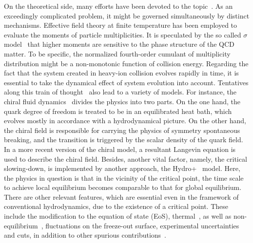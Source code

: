\documentclass[secnumarabic, graphics,floatfix, nofootinbib,tightenlines,nobibnotes, aps, prl, 12pt]{revtex4-1}
\begin{document}
On the theoretical side, many efforts have been devoted to the topic~\cite{qcd-phase-fluctuations-review-01,qcd-phase-fluctuations-review-02}.
As an exceedingly complicated problem, it might be governed simultaneously by distinct mechanisms.
Effective field theory at finite temperature has been employed to evaluate the moments of particle multiplicities.
It is speculated by the so called $\sigma$ model~\cite{qcd-phase-fluctuations-02,qcd-phase-fluctuations-03,qcd-phase-fluctuations-04} that higher moments are sensitive to the phase structure of the QCD matter.
To be specific, the normalized fourth-order cumulant of multiplicity distribution might be a non-monotonic function of collision energy. 
Regarding the fact that the system created in heavy-ion collision evolves rapidly in time, it is essential to take the dynamical effect of system evolution into account.
Tentatives along this train of thought~\cite{hydro-chiral-01} also lead to a variety of models.
For instance, the chiral fluid dynamics~\cite{hydro-chiral-04,hydro-chiral-07,hydro-chiral-08,hydro-chiral-09} divides the physics into two parts.
On the one hand, the quark degree of freedom is treated to be in an equilibrated heat bath, which evolves mostly in accordance with a hydrodynamical picture.
On the other hand, the chiral field is responsible for carrying the physics of symmetry spontaneous breaking, and the transition is triggered by the scalar density of the quark field. 
In a more recent version of the chiral model, a resultant Langevin equation is used to describe the chiral field.
Besides, another vital factor, namely, the critical slowing-down, is implemented by another approach, the Hydro+~\cite{hydro-chiral-sigma-01} model.
Here, the physics in question is that in the vicinity of the critical point, the time scale to achieve local equilibrium becomes comparable to that for global equilibrium.
There are other relevant features, which are essential even in the framework of conventional hydrodynamics, due to the existence of a critical point.
These include the modification to the equation of state (EoS), thermal~\cite{hydro-fluctuations-03}, as well as non-equilibrium~\cite{hydro-fluctuations-02}, fluctuations on the freeze-out surface, experimental uncertainties and cuts, in addition to other spurious contributions~\cite{qcd-phase-fluctuations-08,qcd-phase-fluctuations-09}.
\end{document}
